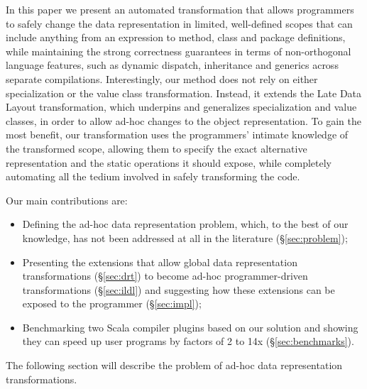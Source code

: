 In this paper we present an automated transformation that allows programmers to safely change the data representation in limited, well-defined scopes that can include anything from an expression to method, class and package definitions, while maintaining the strong correctness guarantees in terms of non-orthogonal language features, such as dynamic dispatch, inheritance and generics across separate compilations. Interestingly, our method does not rely on either specialization or the value class transformation. Instead, it extends the Late Data Layout transformation, which underpins and generalizes specialization and value classes, in order to allow ad-hoc changes to the object representation. To gain the most benefit, our transformation uses the programmers' intimate knowledge of the transformed scope, allowing them to specify the exact alternative representation and the static operations it should expose, while completely automating all the tedium involved in safely transforming the code.

Our main contributions are:
\begin{itemize}
  \item Defining the ad-hoc data representation problem, which, to the best of our knowledge, has not been addressed at all in the literature (\S\ref{sec:problem});
  \item Presenting the extensions that allow global data representation transformations (\S\ref{sec:drt}) to become ad-hoc programmer-driven transformations (\S\ref{sec:ildl}) and suggesting how these extensions can be exposed to the programmer (\S\ref{sec:impl});
  \item Benchmarking two Scala compiler plugins based on our solution and showing they can speed up user programs by factors of 2 to 14x (\S\ref{sec:benchmarks}).
\end{itemize}


The following section will describe the problem of ad-hoc data representation transformations.
